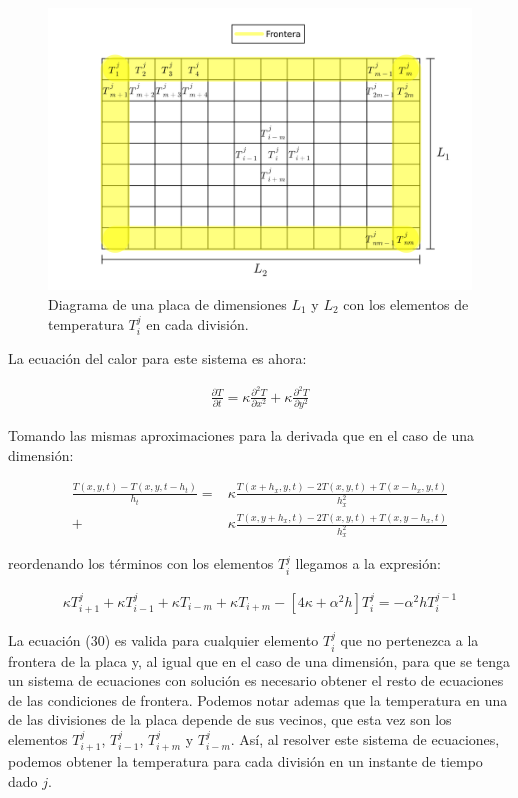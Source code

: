 \documentclass[12pt]{article}
\begin{document}
\begin{figure}[H]
\begin{center}
    \includegraphics[width=1\linewidth]{Placa.png}
    \caption{Diagrama de una placa de dimensiones $L_1$ y $L_2$ con los elementos de temperatura $T_i^j$ en cada división.}
\end{center}
\end{figure}

La ecuación del calor para este sistema es ahora:

\begin{align*}
    \frac{\partial T}{\partial t} = \kappa \frac{\partial^2 T}{\partial x^2} + \kappa \frac{\partial^2 T}{\partial y^2}
\end{align*}

Tomando las mismas aproximaciones para la derivada que en el caso de una dimensión:

\begin{align*}
    \frac{T(x,y,t)-T(x,y,t-h_t)}{h_t} = &\kappa \frac{T(x+h_x,y,t) - 2T(x,y,t) + T(x-h_x,y,t)}{h_x^2} \\
    +&\kappa \frac{T(x,y+h_x,t) - 2T(x,y,t) + T(x,y-h_x,t)}{h_x^2}
\end{align*}

reordenando los términos con los elementos $T_i^j$ llegamos a la expresión:

\begin{align}
    \kappa T_{i+1}^j + \kappa T_{i-1}^j + \kappa T_{i-m} + \kappa T_{i+m} - [4\kappa + \alpha^2 h]T_i^j = -\alpha^2 h T_i^{j-1}
\end{align}

La ecuación (30) es valida para cualquier elemento $T_i^j$ que no pertenezca a la frontera de la placa y, al igual que en el caso de una dimensión, para que se tenga un sistema de ecuaciones con solución es necesario obtener el resto de ecuaciones de las condiciones de frontera. Podemos notar ademas que la temperatura en una de las divisiones de la placa depende de sus vecinos, que esta vez son los elementos $T_{i+1}^j$, $T_{i-1}^j$, $T_{i+m}^j$ y $T_{i-m}^j$. Así, al resolver este sistema de ecuaciones, podemos obtener la temperatura para cada división en un instante de tiempo dado $j$.
\end{document}
